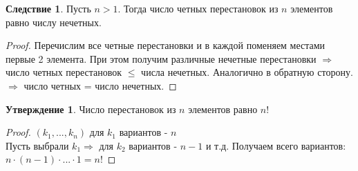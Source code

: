 \documentclass[a4paper, 12pt]{article}
\theoremstyle{definition}
\newtheorem*{consequense}{Следствие}
\newtheorem*{subtheorem}{Утверждение}
\begin{document}
  \begin{consequense}
    Пусть $n>1$. Тогда число четных перестановок из $n$ элементов равно числу нечетных. 
  \end{consequense} 
  \begin{proof}
    Перечислим все четные перестановки и в каждой поменяем местами первые 2 элемента. При этом получим различные нечетные перестановки $\Longrightarrow $ число четных перестановок $\leq$ числа нечетных. Аналогично в обратную сторону. \\
    $\Longrightarrow $ число четных = число нечетных. 
  \end{proof} 
  \begin{subtheorem}
    Число перестановок из $n$ элементов равно $n!$ 
  \end{subtheorem} 
  \begin{proof}
    $(k_1,...,k_n)$ для $k_1$ вариантов - $n$  \\
    Пусть выбрали $k_1 \Longrightarrow$ для  $k_2$ вариантов - $n-1$ и т.д. Получаем всего вариантов: $n\cdot(n-1)\cdot ... \cdot 1 = n! $ 
  \end{proof} 
\end{document}
